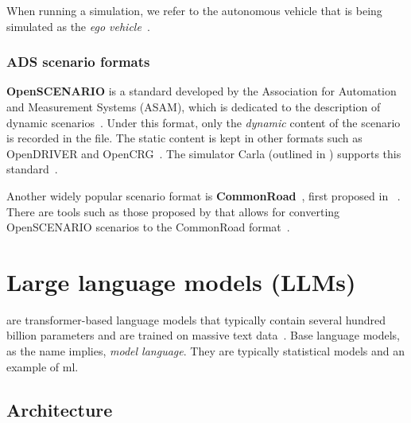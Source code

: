 When running a simulation, we refer to the autonomous vehicle that is being
simulated as the \textit{ego vehicle}~\cite{egoDefinition}.



\subsubsection{ADS scenario formats}\label{sec:adsScenarioFormats}

\textbf{OpenSCENARIO} is a standard developed by the Association for Automation and
Measurement Systems (ASAM), which is dedicated to the description of dynamic
scenarios~\cite[651]{generatingOpenScenario}. Under this format, only the
\textit{dynamic} content of the scenario is recorded in the file. The static
content is kept in other formats such as OpenDRIVER and
OpenCRG~\cite[652]{generatingOpenScenario}. The simulator Carla (outlined in
) supports this
standard~\cite[652]{generatingOpenScenario}.

Another widely popular scenario format is
\textbf{CommonRoad}~\cite[4941]{convOpenScenarioToCR}, first proposed in
~\cite{commonRoadOG}. There are tools such as those
proposed by \citeauthor{convOpenScenarioToCR} that allows for converting
OpenSCENARIO scenarios to the CommonRoad
format~\cite[4941]{convOpenScenarioToCR}.


\section{Large language models (LLMs)}

 are transformer-based language models that typically contain several hundred billion
parameters and are trained on massive text data~\cite[4]{llmSurvey}.
Base language models, as the name implies, \textit{model language}. They are typically statistical
models and an example of \acrfull{ml}.

\subsection{Architecture}\label{sec:llmArch}

